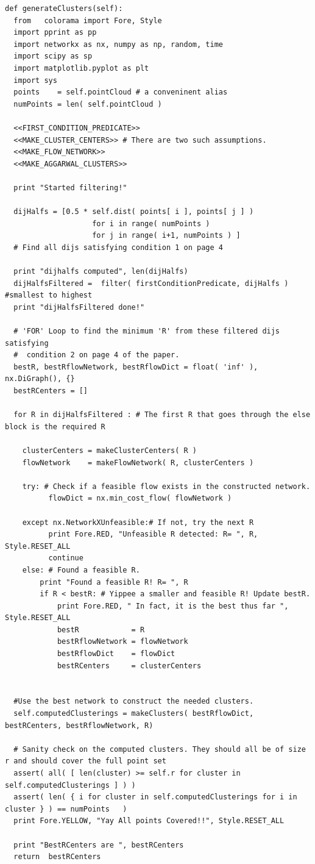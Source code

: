\documentclass[11pt]{article}
\begin{document}
\begin{verbatim}
def generateClusters(self):
  from   colorama import Fore, Style 
  import pprint as pp 
  import networkx as nx, numpy as np, random, time 
  import scipy as sp
  import matplotlib.pyplot as plt
  import sys
  points    = self.pointCloud # a conveninent alias 
  numPoints = len( self.pointCloud )

  <<FIRST_CONDITION_PREDICATE>>
  <<MAKE_CLUSTER_CENTERS>> # There are two such assumptions. 
  <<MAKE_FLOW_NETWORK>>
  <<MAKE_AGGARWAL_CLUSTERS>>

  print "Started filtering!"

  dijHalfs = [0.5 * self.dist( points[ i ], points[ j ] ) 
                    for i in range( numPoints ) 
                    for j in range( i+1, numPoints ) ]
  # Find all dijs satisfying condition 1 on page 4

  print "dijhalfs computed", len(dijHalfs)
  dijHalfsFiltered =  filter( firstConditionPredicate, dijHalfs )  #smallest to highest
  print "dijHalfsFiltered done!"

  # 'FOR' Loop to find the minimum 'R' from these filtered dijs satisfying 
  #  condition 2 on page 4 of the paper. 
  bestR, bestRflowNetwork, bestRflowDict = float( 'inf' ), nx.DiGraph(), {} 
  bestRCenters = []

  for R in dijHalfsFiltered : # The first R that goes through the else block is the required R

    clusterCenters = makeClusterCenters( R )
    flowNetwork    = makeFlowNetwork( R, clusterCenters )

    try: # Check if a feasible flow exists in the constructed network.  
          flowDict = nx.min_cost_flow( flowNetwork )

    except nx.NetworkXUnfeasible:# If not, try the next R
          print Fore.RED, "Unfeasible R detected: R= ", R, Style.RESET_ALL
          continue 
    else: # Found a feasible R.  
        print "Found a feasible R! R= ", R
        if R < bestR: # Yippee a smaller and feasible R! Update bestR. 
            print Fore.RED, " In fact, it is the best thus far ", Style.RESET_ALL 
            bestR            = R
            bestRflowNetwork = flowNetwork
            bestRflowDict    = flowDict
            bestRCenters     = clusterCenters


  #Use the best network to construct the needed clusters. 
  self.computedClusterings = makeClusters( bestRflowDict, bestRCenters, bestRflowNetwork, R)

  # Sanity check on the computed clusters. They should all be of size r and should cover the full point set
  assert( all( [ len(cluster) >= self.r for cluster in self.computedClusterings ] ) )
  assert( len( { i for cluster in self.computedClusterings for i in cluster } ) == numPoints   )
  print Fore.YELLOW, "Yay All points Covered!!", Style.RESET_ALL

  print "BestRCenters are ", bestRCenters 
  return  bestRCenters
\end{verbatim}
\end{document}

